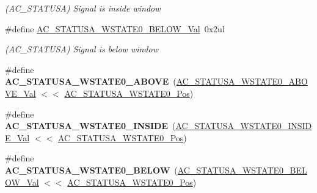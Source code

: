 \begin{DoxyCompactItemize}
\begin{DoxyCompactList}\small\item\em (A\+C\+\_\+\+S\+T\+A\+T\+U\+S\+A) Signal is inside window \end{DoxyCompactList}\item 
\hypertarget{group___s_a_m_l21___a_c_ga7481f1780b3d9ee3f4bb5a35e63e4782}{}\#define \hyperlink{group___s_a_m_l21___a_c_ga7481f1780b3d9ee3f4bb5a35e63e4782}{A\+C\+\_\+\+S\+T\+A\+T\+U\+S\+A\+\_\+\+W\+S\+T\+A\+T\+E0\+\_\+\+B\+E\+L\+O\+W\+\_\+\+Val}~0x2ul\label{group___s_a_m_l21___a_c_ga7481f1780b3d9ee3f4bb5a35e63e4782}

\begin{DoxyCompactList}\small\item\em (A\+C\+\_\+\+S\+T\+A\+T\+U\+S\+A) Signal is below window \end{DoxyCompactList}\item 
\hypertarget{group___s_a_m_l21___a_c_gaa26beaca463da82ccb67ac32155a25c2}{}\#define {\bfseries A\+C\+\_\+\+S\+T\+A\+T\+U\+S\+A\+\_\+\+W\+S\+T\+A\+T\+E0\+\_\+\+A\+B\+O\+V\+E}~(\hyperlink{group___s_a_m_l21___a_c_ga5d68a94c071ee73a4849497dfc57f3a0}{A\+C\+\_\+\+S\+T\+A\+T\+U\+S\+A\+\_\+\+W\+S\+T\+A\+T\+E0\+\_\+\+A\+B\+O\+V\+E\+\_\+\+Val}  $<$$<$ \hyperlink{group___s_a_m_l21___a_c_ga1339364deea09e22e0aa9d6cc65e9548}{A\+C\+\_\+\+S\+T\+A\+T\+U\+S\+A\+\_\+\+W\+S\+T\+A\+T\+E0\+\_\+\+Pos})\label{group___s_a_m_l21___a_c_gaa26beaca463da82ccb67ac32155a25c2}

\item 
\hypertarget{group___s_a_m_l21___a_c_ga7af750c8928ebc16d608a915e2ebdcbc}{}\#define {\bfseries A\+C\+\_\+\+S\+T\+A\+T\+U\+S\+A\+\_\+\+W\+S\+T\+A\+T\+E0\+\_\+\+I\+N\+S\+I\+D\+E}~(\hyperlink{group___s_a_m_l21___a_c_ga98fe4b3c6fd307062f3a7e2c5709bc78}{A\+C\+\_\+\+S\+T\+A\+T\+U\+S\+A\+\_\+\+W\+S\+T\+A\+T\+E0\+\_\+\+I\+N\+S\+I\+D\+E\+\_\+\+Val} $<$$<$ \hyperlink{group___s_a_m_l21___a_c_ga1339364deea09e22e0aa9d6cc65e9548}{A\+C\+\_\+\+S\+T\+A\+T\+U\+S\+A\+\_\+\+W\+S\+T\+A\+T\+E0\+\_\+\+Pos})\label{group___s_a_m_l21___a_c_ga7af750c8928ebc16d608a915e2ebdcbc}

\item 
\hypertarget{group___s_a_m_l21___a_c_ga2d4db2e853559142198477aeac28cf0e}{}\#define {\bfseries A\+C\+\_\+\+S\+T\+A\+T\+U\+S\+A\+\_\+\+W\+S\+T\+A\+T\+E0\+\_\+\+B\+E\+L\+O\+W}~(\hyperlink{group___s_a_m_l21___a_c_ga7481f1780b3d9ee3f4bb5a35e63e4782}{A\+C\+\_\+\+S\+T\+A\+T\+U\+S\+A\+\_\+\+W\+S\+T\+A\+T\+E0\+\_\+\+B\+E\+L\+O\+W\+\_\+\+Val}  $<$$<$ \hyperlink{group___s_a_m_l21___a_c_ga1339364deea09e22e0aa9d6cc65e9548}{A\+C\+\_\+\+S\+T\+A\+T\+U\+S\+A\+\_\+\+W\+S\+T\+A\+T\+E0\+\_\+\+Pos})\label{group___s_a_m_l21___a_c_ga2d4db2e853559142198477aeac28cf0e}


\end{DoxyCompactItemize}

